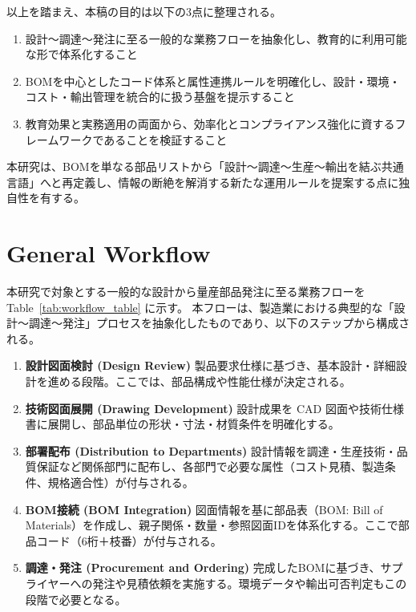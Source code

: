 \documentclass[10pt,conference]{IEEEtran}
\begin{document}
以上を踏まえ、本稿の目的は以下の3点に整理される。
\begin{enumerate}
  \item 設計～調達～発注に至る一般的な業務フローを抽象化し、教育的に利用可能な形で体系化すること
  \item BOMを中心としたコード体系と属性連携ルールを明確化し、設計・環境・コスト・輸出管理を統合的に扱う基盤を提示すること
  \item 教育効果と実務適用の両面から、効率化とコンプライアンス強化に資するフレームワークであることを検証すること
\end{enumerate}

本研究は、BOMを単なる部品リストから「設計～調達～生産～輸出を結ぶ共通言語」へと再定義し、情報の断絶を解消する新たな運用ルールを提案する点に独自性を有する。

\section{General Workflow}
本研究で対象とする一般的な設計から量産部品発注に至る業務フローを Table~\ref{tab:workflow_table} に示す。
本フローは、製造業における典型的な「設計～調達～発注」プロセスを抽象化したものであり、以下のステップから構成される。

\begin{enumerate}
  \item \textbf{設計図面検討 (Design Review)}  
  製品要求仕様に基づき、基本設計・詳細設計を進める段階。ここでは、部品構成や性能仕様が決定される。
  
  \item \textbf{技術図面展開 (Drawing Development)}  
  設計成果を CAD 図面や技術仕様書に展開し、部品単位の形状・寸法・材質条件を明確化する。
  
  \item \textbf{部署配布 (Distribution to Departments)}  
  設計情報を調達・生産技術・品質保証など関係部門に配布し、各部門で必要な属性（コスト見積、製造条件、規格適合性）が付与される。
  
  \item \textbf{BOM接続 (BOM Integration)}  
  図面情報を基に部品表（BOM: Bill of Materials）を作成し、親子関係・数量・参照図面IDを体系化する。ここで部品コード（6桁＋枝番）が付与される。
  
  \item \textbf{調達・発注 (Procurement and Ordering)}  
  完成したBOMに基づき、サプライヤーへの発注や見積依頼を実施する。環境データや輸出可否判定もこの段階で必要となる。
\end{enumerate}
\end{document}
